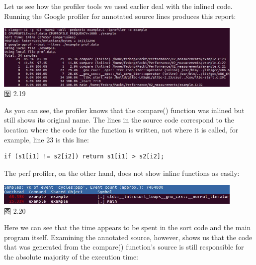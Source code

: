 Let us see how the profiler tools we used earlier deal with the inlined code. Running the Google profiler for annotated source lines produces this report:

\begin{center}
\includegraphics[width=0.9\textwidth]{content/1/chapter2/images/19.jpg}\\
图 2.19
\end{center}

As you can see, the profiler knows that the compare() function was inlined but still shows its original name. The lines in the source code correspond to the location where the code for the function is written, not where it is called, for example, line 23 is this line:

\begin{lstlisting}[style=styleCXX]
if (s1[i1] != s2[i2]) return s1[i1] > s2[i2];
\end{lstlisting}

The perf profiler, on the other hand, does not show inline functions as easily:

\begin{center}
\includegraphics[width=0.9\textwidth]{content/1/chapter2/images/20.jpg}\\
图 2.20
\end{center}

Here we can see that the time appears to be spent in the sort code and the main program itself. Examining the annotated source, however, shows us that the code that was generated from the compare() function's source is still responsible for the absolute majority of the execution time:

